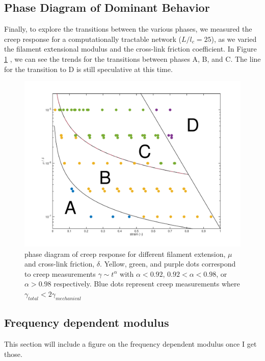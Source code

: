 \documentclass[pre,preprint]{revtex4-1}
\begin{document}
\subsection{Phase Diagram of Dominant Behavior}
Finally, to explore the transitions between the various phases, we measured the creep response for a computationally tractable network ($L/l_c = 25$), as we varied the filament extensional modulus and the cross-link friction coefficient.  In Figure \ref{fig:phase_diag} , we can see the trends for the transitions between phases A, B, and C.  The line for the transition to D is still speculative at this time.

\begin{figure}[h!]
\centering
\includegraphics[width=\hsize]{phase_diag}
\caption{\label{fig:phase_diag} phase diagram of creep response for different filament extension, $\mu$ and cross-link friction, $\delta$.  Yellow, green, and purple dots correspond to creep measurements $\gamma \sim t^\alpha$ with $\alpha<0.92$, $0.92<\alpha<0.98$, or $\alpha>0.98$ respectively.  Blue dots represent creep measurements where $\gamma_{total} < 2\gamma_{mechanical}$}
\end{figure}


\subsection{Frequency dependent modulus}
This section will include a figure on the frequency dependent modulus once I get those.
\end{document}
